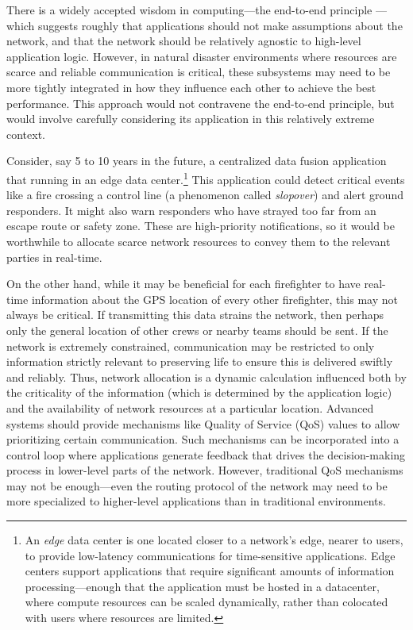 \documentclass[]             %
{NASA}                       %
\theoremstyle{definition}
\begin{document}
There is a widely accepted wisdom in computing---the end-to-end
principle \cite{1984:end-to-end}---which suggests roughly that
applications should not make assumptions about the network, and that
the network should be relatively agnostic to high-level application
logic. However, in natural disaster environments where resources are
scarce and reliable communication is critical, these subsystems may
need to be more tightly integrated in how they influence each other to
achieve the best performance. This approach would not contravene the
end-to-end principle, but would involve carefully considering its
application in this relatively extreme context.

Consider, say 5 to 10 years in the future, a centralized data fusion
application that running in an edge data center.\footnote{An
  \emph{edge} data center is one located closer to a network's edge,
  nearer to users, to provide low-latency communications for
  time-sensitive applications. Edge centers support applications that
  require significant amounts of information processing---enough that
  the application must be hosted in a datacenter, where compute
  resources can be scaled dynamically, rather than colocated with
  users where resources are limited.} This application could detect
critical events like a fire crossing a control line (a phenomenon
called \emph{slopover}) and alert ground responders. It might also
warn responders who have strayed too far from an escape route or
safety zone. These are high-priority notifications, so it would be
worthwhile to allocate scarce network resources to convey them to the
relevant parties in real-time.

On the other hand, while it may be beneficial for each firefighter to
have real-time information about the GPS location of every other
firefighter, this may not always be critical. If transmitting this
data strains the network, then perhaps only the general location of
other crews or nearby teams should be sent. If the network is
extremely constrained, communication may be restricted to only
information strictly relevant to preserving life to ensure this is
delivered swiftly and reliably. Thus, network allocation is a dynamic
calculation influenced both by the criticality of the information
(which is determined by the application logic) and the availability of
network resources at a particular location. Advanced systems should
provide mechanisms like Quality of Service (QoS) values to allow
prioritizing certain communication. Such mechanisms can be
incorporated into a control loop where applications generate feedback
that drives the decision-making process in lower-level parts of the
network. However, traditional QoS mechanisms may not be enough---even
the routing protocol of the network may need to be more specialized to
higher-level applications than in traditional environments.
\end{document}
